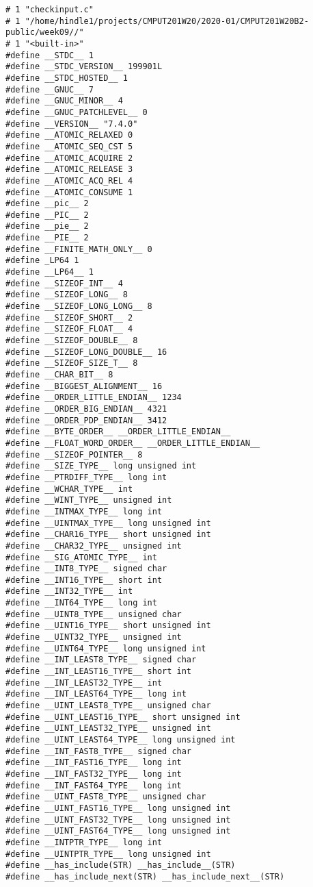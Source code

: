 \documentclass[11pt]{article}
\begin{document}
\begin{verbatim}
# 1 "checkinput.c"
# 1 "/home/hindle1/projects/CMPUT201W20/2020-01/CMPUT201W20B2-public/week09//"
# 1 "<built-in>"
#define __STDC__ 1
#define __STDC_VERSION__ 199901L
#define __STDC_HOSTED__ 1
#define __GNUC__ 7
#define __GNUC_MINOR__ 4
#define __GNUC_PATCHLEVEL__ 0
#define __VERSION__ "7.4.0"
#define __ATOMIC_RELAXED 0
#define __ATOMIC_SEQ_CST 5
#define __ATOMIC_ACQUIRE 2
#define __ATOMIC_RELEASE 3
#define __ATOMIC_ACQ_REL 4
#define __ATOMIC_CONSUME 1
#define __pic__ 2
#define __PIC__ 2
#define __pie__ 2
#define __PIE__ 2
#define __FINITE_MATH_ONLY__ 0
#define _LP64 1
#define __LP64__ 1
#define __SIZEOF_INT__ 4
#define __SIZEOF_LONG__ 8
#define __SIZEOF_LONG_LONG__ 8
#define __SIZEOF_SHORT__ 2
#define __SIZEOF_FLOAT__ 4
#define __SIZEOF_DOUBLE__ 8
#define __SIZEOF_LONG_DOUBLE__ 16
#define __SIZEOF_SIZE_T__ 8
#define __CHAR_BIT__ 8
#define __BIGGEST_ALIGNMENT__ 16
#define __ORDER_LITTLE_ENDIAN__ 1234
#define __ORDER_BIG_ENDIAN__ 4321
#define __ORDER_PDP_ENDIAN__ 3412
#define __BYTE_ORDER__ __ORDER_LITTLE_ENDIAN__
#define __FLOAT_WORD_ORDER__ __ORDER_LITTLE_ENDIAN__
#define __SIZEOF_POINTER__ 8
#define __SIZE_TYPE__ long unsigned int
#define __PTRDIFF_TYPE__ long int
#define __WCHAR_TYPE__ int
#define __WINT_TYPE__ unsigned int
#define __INTMAX_TYPE__ long int
#define __UINTMAX_TYPE__ long unsigned int
#define __CHAR16_TYPE__ short unsigned int
#define __CHAR32_TYPE__ unsigned int
#define __SIG_ATOMIC_TYPE__ int
#define __INT8_TYPE__ signed char
#define __INT16_TYPE__ short int
#define __INT32_TYPE__ int
#define __INT64_TYPE__ long int
#define __UINT8_TYPE__ unsigned char
#define __UINT16_TYPE__ short unsigned int
#define __UINT32_TYPE__ unsigned int
#define __UINT64_TYPE__ long unsigned int
#define __INT_LEAST8_TYPE__ signed char
#define __INT_LEAST16_TYPE__ short int
#define __INT_LEAST32_TYPE__ int
#define __INT_LEAST64_TYPE__ long int
#define __UINT_LEAST8_TYPE__ unsigned char
#define __UINT_LEAST16_TYPE__ short unsigned int
#define __UINT_LEAST32_TYPE__ unsigned int
#define __UINT_LEAST64_TYPE__ long unsigned int
#define __INT_FAST8_TYPE__ signed char
#define __INT_FAST16_TYPE__ long int
#define __INT_FAST32_TYPE__ long int
#define __INT_FAST64_TYPE__ long int
#define __UINT_FAST8_TYPE__ unsigned char
#define __UINT_FAST16_TYPE__ long unsigned int
#define __UINT_FAST32_TYPE__ long unsigned int
#define __UINT_FAST64_TYPE__ long unsigned int
#define __INTPTR_TYPE__ long int
#define __UINTPTR_TYPE__ long unsigned int
#define __has_include(STR) __has_include__(STR)
#define __has_include_next(STR) __has_include_next__(STR)

\end{verbatim}
\end{document}
